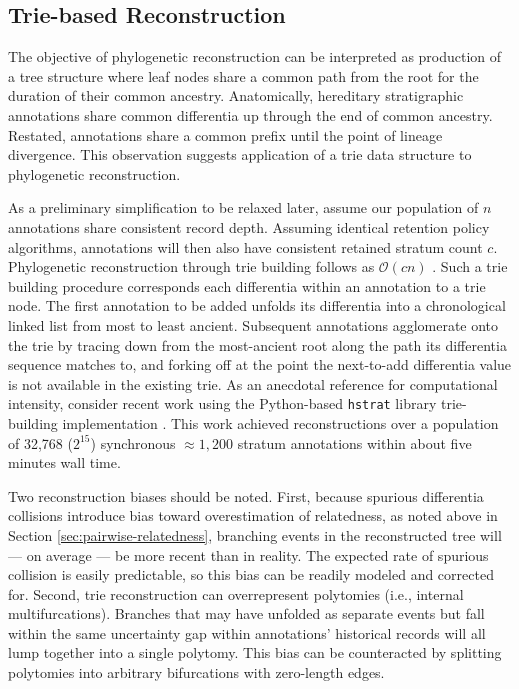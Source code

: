 \subsection{Trie-based Reconstruction}
\label{sec:trie-based-reconstruction}

The objective of phylogenetic reconstruction can be interpreted as production of a tree structure where leaf nodes share a common path from the root for the duration of their common ancestry.
Anatomically, hereditary stratigraphic annotations share common differentia up through the end of common ancestry.
Restated, annotations share a common prefix until the point of lineage divergence.
This observation suggests application of a trie data structure \citep{fredkin1960trie} to phylogenetic reconstruction.

As a preliminary simplification to be relaxed later, assume our population of $n$ annotations share consistent record depth.
Assuming identical retention policy algorithms, annotations will then also have consistent retained stratum count $c$.
Phylogenetic reconstruction through trie building follows as $\mathcal{O}(c n)$ \citep{mehta2018handbook}.
Such a trie building procedure corresponds each differentia within an annotation to a trie node.
The first annotation to be added unfolds its differentia into a chronological linked list from most to least ancient.
Subsequent annotations agglomerate onto the trie by tracing down from the most-ancient root along the path its differentia sequence matches to, and forking off at the point the next-to-add differentia value is not available in the existing trie.
As an anecdotal reference for computational intensity, consider recent work using the Python-based \texttt{hstrat} library trie-building implementation \citep{moreno2023toward}.
This work achieved reconstructions over a population of 32,768 ($2^{15}$) synchronous $\approx 1,200$ stratum annotations within about five minutes wall time.

Two reconstruction biases should be noted.
First, because spurious differentia collisions introduce bias toward overestimation of relatedness, as noted above in Section \ref{sec:pairwise-relatedness}, branching events in the reconstructed tree will --- on average --- be more recent than in reality.
The expected rate of spurious collision is easily predictable, so this bias can be readily modeled and corrected for.
Second, trie reconstruction can overrepresent polytomies (i.e., internal multifurcations).
Branches that may have unfolded as separate events but fall within the same uncertainty gap within annotations' historical records will all lump together into a single polytomy.
This bias can be counteracted by splitting polytomies into arbitrary bifurcations with zero-length edges.

